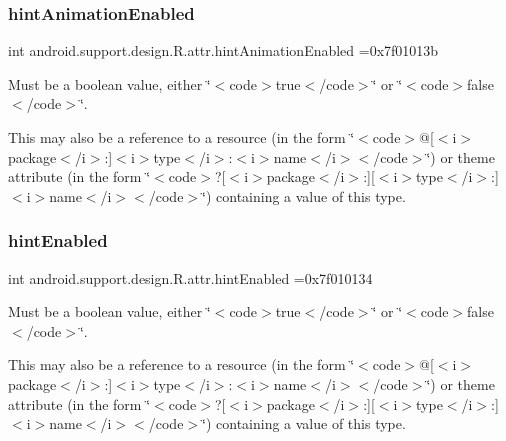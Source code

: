 \subsubsection{\texorpdfstring{hint\+Animation\+Enabled}{hintAnimationEnabled}}
{\footnotesize\ttfamily int android.\+support.\+design.\+R.\+attr.\+hint\+Animation\+Enabled =0x7f01013b\hspace{0.3cm}{\ttfamily [static]}}

Must be a boolean value, either \char`\"{}$<$code$>$true$<$/code$>$\char`\"{} or \char`\"{}$<$code$>$false$<$/code$>$\char`\"{}. 

This may also be a reference to a resource (in the form \char`\"{}$<$code$>$@\mbox{[}$<$i$>$package$<$/i$>$\+:\mbox{]}$<$i$>$type$<$/i$>$\+:$<$i$>$name$<$/i$>$$<$/code$>$\char`\"{}) or theme attribute (in the form \char`\"{}$<$code$>$?\mbox{[}$<$i$>$package$<$/i$>$\+:\mbox{]}\mbox{[}$<$i$>$type$<$/i$>$\+:\mbox{]}$<$i$>$name$<$/i$>$$<$/code$>$\char`\"{}) containing a value of this type. \mbox{\label{classandroid_1_1support_1_1design_1_1R_1_1attr_afd69514a0f20d586a6ecea123884303c}} 
\subsubsection{\texorpdfstring{hint\+Enabled}{hintEnabled}}
{\footnotesize\ttfamily int android.\+support.\+design.\+R.\+attr.\+hint\+Enabled =0x7f010134\hspace{0.3cm}{\ttfamily [static]}}

Must be a boolean value, either \char`\"{}$<$code$>$true$<$/code$>$\char`\"{} or \char`\"{}$<$code$>$false$<$/code$>$\char`\"{}. 

This may also be a reference to a resource (in the form \char`\"{}$<$code$>$@\mbox{[}$<$i$>$package$<$/i$>$\+:\mbox{]}$<$i$>$type$<$/i$>$\+:$<$i$>$name$<$/i$>$$<$/code$>$\char`\"{}) or theme attribute (in the form \char`\"{}$<$code$>$?\mbox{[}$<$i$>$package$<$/i$>$\+:\mbox{]}\mbox{[}$<$i$>$type$<$/i$>$\+:\mbox{]}$<$i$>$name$<$/i$>$$<$/code$>$\char`\"{}) containing a value of this type. \mbox{\label{classandroid_1_1support_1_1design_1_1R_1_1attr_a8c3c8800b2a920626f8ebd3de5dd34b3}} 
